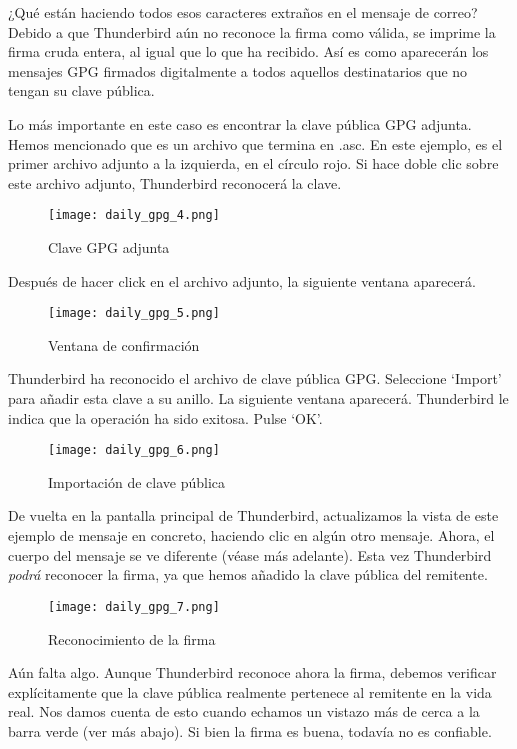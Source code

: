 \documentclass[10pt,a5paper,twoside,,]{book}
\begin{document}
¿Qué están haciendo todos esos caracteres extraños en el mensaje de
correo? Debido a que Thunderbird aún no reconoce la firma como válida,
se imprime la firma cruda entera, al igual que lo que ha recibido. Así
es como aparecerán los mensajes GPG firmados digitalmente a todos
aquellos destinatarios que no tengan su clave pública.

Lo más importante en este caso es encontrar la clave pública GPG
adjunta. Hemos mencionado que es un archivo que termina en .asc. En este
ejemplo, es el primer archivo adjunto a la izquierda, en el círculo
rojo. Si hace doble clic sobre este archivo adjunto, Thunderbird
reconocerá la clave.

\begin{figure}[htbp]
\centering
\texttt{[image: daily\_gpg\_4.png]}
\caption{Clave GPG adjunta}
\end{figure}

Después de hacer click en el archivo adjunto, la siguiente ventana
aparecerá.

\begin{figure}[htbp]
\centering
\texttt{[image: daily\_gpg\_5.png]}
\caption{Ventana de confirmación}
\end{figure}

Thunderbird ha reconocido el archivo de clave pública GPG. Seleccione
`Import' para añadir esta clave a su anillo. La siguiente ventana
aparecerá. Thunderbird le indica que la operación ha sido exitosa. Pulse
`OK'.

\begin{figure}[htbp]
\centering
\texttt{[image: daily\_gpg\_6.png]}
\caption{Importación de clave pública}
\end{figure}

De vuelta en la pantalla principal de Thunderbird, actualizamos la vista
de este ejemplo de mensaje en concreto, haciendo clic en algún otro
mensaje. Ahora, el cuerpo del mensaje se ve diferente (véase más
adelante). Esta vez Thunderbird \emph{podrá} reconocer la firma, ya que
hemos añadido la clave pública del remitente.

\begin{figure}[htbp]
\centering
\texttt{[image: daily\_gpg\_7.png]}
\caption{Reconocimiento de la firma}
\end{figure}

Aún falta algo. Aunque Thunderbird reconoce ahora la firma, debemos
verificar explícitamente que la clave pública realmente pertenece al
remitente en la vida real. Nos damos cuenta de esto cuando echamos un
vistazo más de cerca a la barra verde (ver más abajo). Si bien la firma
es buena, todavía no es confiable.
\end{document}

